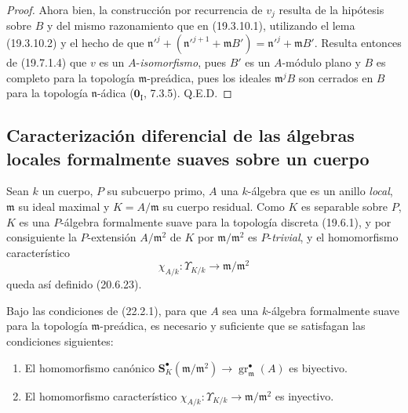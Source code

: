 \begin{proof}
Ahora bien, la construcción por recurrencia de $v_j$ resulta de la hipótesis
sobre $B$ y del 
mismo razonamiento que en (19.3.10.1), utilizando el lema
(19.3.10.2) y el hecho de que
$\mathfrak n'^j+(\mathfrak n'^{j+1}+\mathfrak mB')=\mathfrak n'^j+\mathfrak mB'$.
Resulta entonces de (19.7.1.4) que $v$ es un $A$-\emph{isomorfismo}, pues
$B'$ es un $A$-módulo plano y $B$ es completo para la topología
$\mathfrak m$-preádica, pues los ideales $\mathfrak m^jB$ son cerrados en $B$
para la topología $\mathfrak n$-ádica ($\mathbf 0_{\mathrm I}$, 7.3.5).
Q.E.D.
\end{proof}

\subsection{Caracterización diferencial de las álgebras locales formalmente
suaves sobre un cuerpo}
\label{subsection:0.22.2-fr}

\begin{env}[22.2.1]
\label{0.22.2.1-fr}
Sean $k$ un cuerpo, $P$ su subcuerpo primo, $A$ una $k$-álgebra que es un
anillo \emph{local}, $\mathfrak m$ su ideal maximal y $K=A/\mathfrak m$ su
cuerpo residual. Como $K$ es separable sobre $P$, $K$ es una $P$-álgebra
formalmente suave para la topología discreta (19.6.1), y por consiguiente la
$P$-extensión $A/\mathfrak m^2$ de $K$ por $\mathfrak m/\mathfrak m^2$ es
$P$-\emph{trivial}, y el homomorfismo característico
\begin{equation}
\tag{22.2.1.1}
\label{0.22.2.1.1-fr}
  \chi_{A/k}:\Upsilon_{K/k}\longrightarrow\mathfrak m/\mathfrak m^2
\end{equation}
queda así definido (20.6.23).
\end{env}

\begin{theorem}[22.2.2]
\label{0.22.2.2-fr}
Bajo las condiciones de \textup{(22.2.1)}, para que $A$ sea una $k$-álgebra
formalmente suave para la topología $\mathfrak m$-preádica, es necesario y
suficiente que se satisfagan las condiciones siguientes:
\begin{enumerate}
  \item[\textup{(i)}] El homomorfismo canónico
  $\mathbf S_K^\bullet(\mathfrak m/\mathfrak m^2)\to
  \operatorname{gr}_{\mathfrak m}^\bullet(A)$ es biyectivo.
  \item[\textup{(ii)}] El homomorfismo característico
  $\chi_{A/k}:\Upsilon_{K/k}\to\mathfrak m/\mathfrak m^2$ es inyectivo.
\end{enumerate}
\end{theorem}

